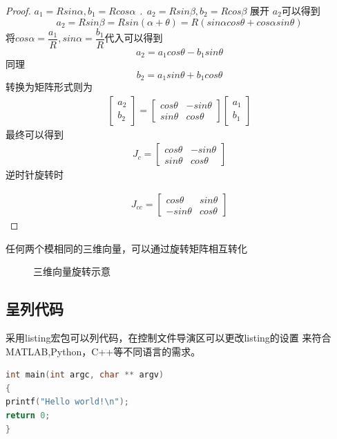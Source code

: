\begin{proof}
$ a_1=Rsin\alpha , b_1=Rcos\alpha~~ .~~ a_2=Rsin\beta ,b_2=Rcos\beta $
展开  $ a_2 $可以得到
\[a_2=Rsin\beta=Rsin(\alpha+\theta)=R(sin\alpha cos\theta +cos\alpha sin \theta)\]  
将$cos\alpha=\dfrac{a_1}{R},sin\alpha=\dfrac{b_1}{R}$代入可以得到\[a_2=a_1 cos\theta-b_1 sin\theta \] 同理\[ b_2=a_1 sin\theta+b_1 cos\theta \] 转换为矩阵形式则为
 \begin{align} \begin{bmatrix}
 a_2\\b_2 
\end{bmatrix}=
\begin{bmatrix}
 cos\theta&-sin\theta\\sin\theta& cos\theta
\end{bmatrix}  
\begin{bmatrix}
 a_1\\b_1 
\end{bmatrix}\end{align}
 最终可以得到
 \begin{align}
 \label{Jc}
  {J}_c=\begin{bmatrix} cos\theta&-sin\theta\\sin\theta& cos\theta
\end{bmatrix} 
\end{align}
 逆时针旋转时

\begin{align}
\label{Jcc}
{J}_{cc} =\begin{bmatrix} cos\theta&sin\theta\\-sin\theta& cos\theta
\end{bmatrix}
\end{align}
\end{proof}
\begin{theorem}
任何两个模相同的三维向量，可以通过旋转矩阵相互转化
\end{theorem}
\begin{figure}[h]
\centering
{}
\caption{三维向量旋转示意}
\label{fig:3Drot}
\end{figure}

\subsection{呈列代码}
采用listing宏包可以列代码，在控制文件导演区可以更改listing的设置
来符合MATLAB,Python，C++等不同语言的需求。
\begin{lstlisting}[language=C]
int main(int argc, char ** argv)
{
printf("Hello world!\n");
return 0;
}
\end{lstlisting}